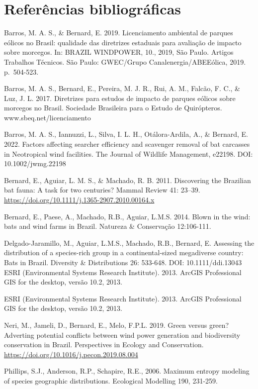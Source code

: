\documentclass[
  oneside]{scrbook}
\begin{document}
\hypertarget{referuxeancias-bibliogruxe1ficas-8}{%
\section{Referências bibliográficas}\label{referuxeancias-bibliogruxe1ficas-8}}

Barros, M. A. S., \& Bernard, E. 2019. Licenciamento ambiental de parques eólicos no Brasil: qualidade das diretrizes estaduais para avaliação de impacto sobre morcegos. In: BRAZIL WINDPOWER, 10., 2019, São Paulo. Artigos Trabalhos Técnicos. São Paulo: GWEC/Grupo Canalenergia/ABEEólica, 2019. p.~504-523.

Barros, M. A. S., Bernard, E., Pereira, M. J. R., Rui, A. M., Falcão, F. C., \& Luz, J. L. 2017. Diretrizes para estudos de impacto de parques eólicos sobre morcegos no Brasil. Sociedade Brasileira para o Estudo de Quirópteros. www.sbeq.net/licenciamento

Barros, M. A. S., Iannuzzi, L., Silva, I. L. H., Otálora-Ardila, A., \& Bernard, E. 2022. Factors affecting searcher efficiency and scavenger removal of bat carcasses in Neotropical wind facilities. The Journal of Wildlife Management, e22198. DOI: 10.1002/jwmg.22198

Bernard, E., Aguiar, L. M. S., \& Machado, R. B. 2011. Discovering the Brazilian bat fauna: A task for two centuries? Mammal Review 41: 23--39. \url{https://doi.org/10.1111/j.1365-2907.2010.00164.x}

Bernard, E., Paese, A., Machado, R.B., Aguiar, L.M.S. 2014. Blown in the wind: bats and wind farms in Brazil. Natureza \& Conservação 12:106-111.

Delgado-Jaramillo, M., Aguiar, L.M.S., Machado, R.B., Bernard, E. Assessing the distribution of a species-rich group in a continental-sized megadiverse country: Bats in Brazil. Diversity \& Distributions 26: 533-648. DOI: 10.1111/ddi.13043
ESRI (Environmental Systems Research Institute). 2013. ArcGIS Professional GIS for the desktop, versão 10.2, 2013.

ESRI (Environmental Systems Research Institute). 2013. ArcGIS Professional GIS for the desktop, versão 10.2, 2013.

Neri, M., Jameli, D., Bernard, E., Melo, F.P.L. 2019. Green versus green? Adverting potential conflicts between wind power generation and biodiversity conservation in Brazil. Perspectives in Ecology and Conservation. \url{https://doi.org/10.1016/j.pecon.2019.08.004}

Phillips, S.J., Anderson, R.P., Schapire, R.E., 2006. Maximum entropy modeling of species geographic distributions. Ecological Modelling 190, 231-259.
\end{document}
